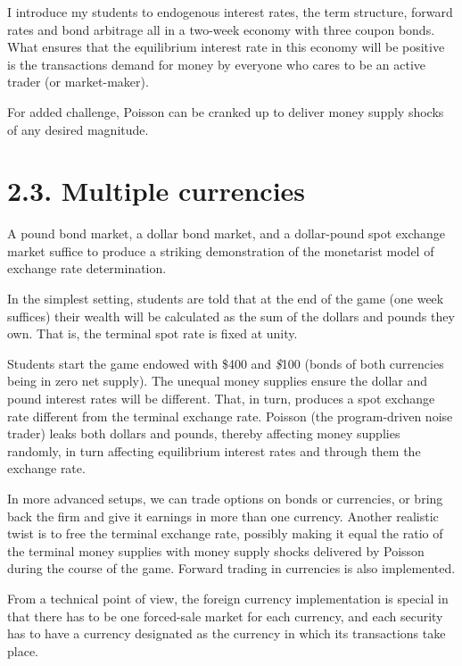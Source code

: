 I introduce my students to endogenous interest rates, the term 
structure, forward rates and bond arbitrage all in a two-week economy 
with three coupon bonds.  What ensures that the equilibrium interest 
rate in this economy will be positive is the transactions demand for money 
by everyone who cares to be an active trader (or market-maker).%
 
For added challenge, Poisson can be cranked up to deliver money supply 
shocks of any desired magnitude. 
 
\section{2.3. Multiple currencies}%
A pound bond market, a dollar bond market, and a dollar-pound spot 
exchange market suffice to produce a striking demonstration of the 
monetarist model of exchange rate determination. 
 
In the simplest setting, students are told that at the end of the 
game (one week suffices) their wealth will be calculated as the sum 
of the dollars and pounds they own.  That is, the terminal spot rate 
is fixed at unity. 
 
Students start the game endowed with \$400 and {\it\$}100 (bonds of 
both currencies being in zero net supply).  The unequal money 
supplies ensure the dollar and pound interest rates will be 
different.  That, in turn, produces a spot exchange rate different 
from the terminal exchange rate.  Poisson (the program-driven noise 
trader) leaks both dollars and pounds, thereby affecting money 
supplies randomly, in turn affecting equilibrium interest rates and 
through them the exchange rate. 
 
In more advanced setups, we can trade options on bonds or currencies, 
or bring back the firm and give it earnings in more than one currency. 
Another realistic twist is to free the terminal exchange rate, possibly 
making it equal the ratio of the terminal money supplies with 
money supply shocks delivered by Poisson during the course of the game. 
Forward trading in currencies is also implemented. 
 
From a technical point of view, the foreign currency implementation is 
special in that there has to be one forced-sale market for each currency, 
and each security has to have a currency designated as the currency 
in which its transactions take place. 
 
